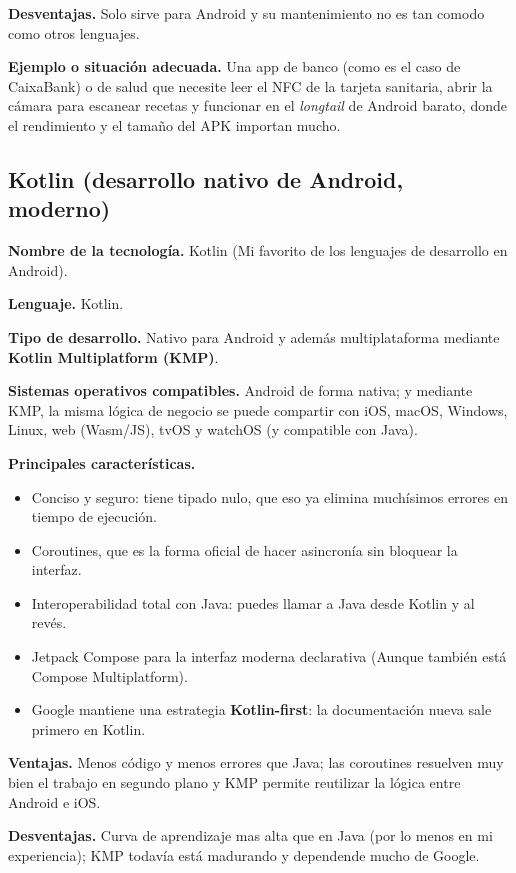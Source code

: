 \documentclass[11pt,a4paper]{article}
\newcommand{\campo}[1]{\textbf{\color{navy}#1}}
\begin{document}
	\campo{Desventajas.} Solo sirve para Android y su mantenimiento no es tan comodo como otros lenguajes.
	
  \campo{Ejemplo o situación adecuada.} Una app de banco (como es el caso de CaixaBank) o de salud que necesite leer el NFC de la tarjeta sanitaria, abrir la cámara para escanear recetas y funcionar en el \emph{longtail} de Android barato, donde el rendimiento y el tamaño del APK importan mucho.
	
	\subsection{Kotlin (desarrollo nativo de Android, moderno)}
	
  \campo{Nombre de la tecnología.} Kotlin (Mi favorito de los lenguajes de desarrollo en Android).
	
	\campo{Lenguaje.} Kotlin.
	
	\campo{Tipo de desarrollo.} Nativo para Android y además multiplataforma mediante \textbf{Kotlin Multiplatform (KMP)}.
	
  \campo{Sistemas operativos compatibles.} Android de forma nativa; y mediante KMP, la misma lógica de negocio se puede compartir con iOS, macOS, Windows, Linux, web (Wasm/JS), tvOS y watchOS (y compatible con Java).
	
	\campo{Principales características.}
	\begin{itemize}[leftmargin=*,itemsep=0.2em,topsep=0.2em]
		\item Conciso y seguro: tiene tipado nulo, que eso ya elimina muchísimos errores en tiempo de ejecución.
		\item Coroutines, que es la forma oficial de hacer asincronía sin bloquear la interfaz.
		\item Interoperabilidad total con Java: puedes llamar a Java desde Kotlin y al revés.
    \item Jetpack Compose para la interfaz moderna declarativa (Aunque también está Compose Multiplatform).
		\item Google mantiene una estrategia \textbf{Kotlin-first}: la documentación nueva sale primero en Kotlin.
	\end{itemize}
	
	\campo{Ventajas.} Menos código y menos errores que Java; las coroutines resuelven muy bien el trabajo en segundo plano y KMP permite reutilizar la lógica entre Android e iOS.
	
  \campo{Desventajas.} Curva de aprendizaje mas alta que en Java (por lo menos en mi experiencia); KMP todavía está madurando y dependende mucho de Google.
	
\end{document}
